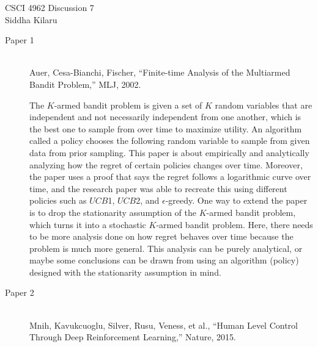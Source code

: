 \documentclass[12pt]{article}
\begin{document}
\noindent CSCI 4962 \hfill Discussion 7 \\
Siddha Kilaru \\
    

\begin{description}
    \item[Paper 1] \hfill \\
    Auer, Cesa-Bianchi, Fischer, ``Finite-time Analysis of the Multiarmed Bandit
    Problem,'' MLJ, 2002.

    The $K$-armed bandit problem is given a set of $K$ random variables that
    are independent and not necessarily independent from one another, which is
    the best one to sample from over time to maximize utility. An algorithm
    called a policy chooses the following random variable to sample from given
    data from prior sampling. This paper is about empirically and analytically
    analyzing how the regret of certain policies changes over time. Moreover,
    the paper uses a proof that says the regret follows a logarithmic curve
    over time, and the research paper was able to recreate this using different
    policies such as $UCB$1, $UCB$2, and $\epsilon$-greedy. One way to extend
    the paper is to drop the stationarity assumption of the $K$-armed bandit
    problem, which turns it into a stochastic $K$-armed bandit problem. Here,
    there needs to be more analysis done on how regret behaves over time
    because the problem is much more general. This analysis can be purely
    analytical, or maybe some conclusions can be drawn from using an algorithm
    (policy) designed with the stationarity assumption in mind.
    \item[Paper 2] \hfill \\
    Mnih, Kavukcuoglu, Silver, Rusu, Veness, et al., ``Human Level Control
    Through Deep Reinforcement Learning,'' Nature, 2015.


\end{description}
\end{document}
